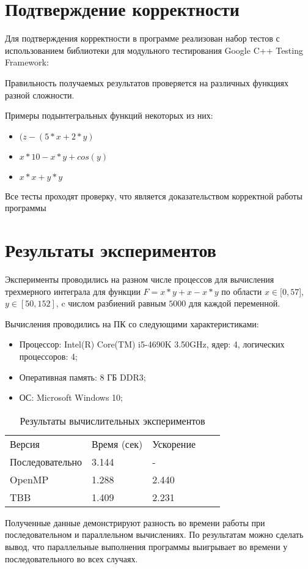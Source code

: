\documentclass{report}
\begin{document}
\section*{Подтверждение корректности}
\par Для подтверждения корректности в программе реализован набор тестов с использованием библиотеки для модульного тестирования Google C++ Testing Framework:
\par Правильность получаемых результатов проверяется на различных функциях разной сложности.
\par Примеры подынтегральных функций некоторых из них:
\begin{itemize}
\item $(z - (5 * x + 2 * y)$
\item $x * 10 - x * y + cos(y)$
\item $x * x + y * y$
\end{itemize}
\par Все тесты проходят проверку, что является доказательством корректной работы программы
\newpage

\section*{Результаты экспериментов}
Эксперименты проводились на разном числе процессов для вычисления трехмерного интеграла для функции 
$F = x * y + x - x * y$ по области $x\in[0,57$], $y\in[50,152]$, c числом разбиений равным $5000$ для каждой переменной.
\par Вычисления проводились на ПК со следующими характеристиками:
\begin{itemize}
\item Процессор: Intel(R) Core(TM) i5-4690K 3.50GHz, ядер: 4, логических процессоров: 4;
\item Оперативная память: 8 ГБ DDR3;
\item ОС: Microsoft Windows 10;
\end{itemize}
\par
\begin{table}[!h]
\centering
\begin{tabular}{lllll}
Версия & Время (сек) & Ускорение  \\
Последовательно   & 3.144 & -  \\
OpenMP  & 1.288 & 2.440  \\
TBB  & 1.409 & 2.231  \\
\end{tabular}
\caption{Результаты вычислительных экспериментов}
\end{table}
\par Полученные данные демонстрируют разность во времени работы при последовательном и параллельном вычислениях. По результатам можно сделать вывод, что параллельные выполнения программы выигрывает во времени у последовательного во всех случаях.
\newpage
\end{document}
